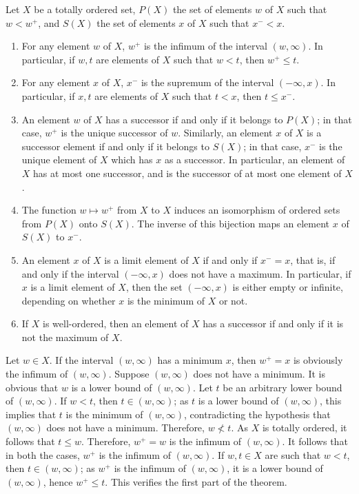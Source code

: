 \documentclass{article}
\begin{document}
\begin{theorem}
  \label{thm:q8h11s4b}
  Let \(X\) be a totally ordered set, \(P(X)\) the set of elements
  \(w\) of \(X\) such that \(w < w^+\), and \(S(X)\) the set of
  elements \(x\) of \(X\) such that \(x^- < x\).
  \begin{enumerate}
  \item For any element \(w\) of \(X\), \(w^+\) is the infimum of the
    interval \((w, \infty)\).  In particular, if \(w, t\) are elements
    of \(X\) such that \(w < t\), then \(w^+ \leq t\).
  \item For any element \(x\) of \(X\), \(x^-\) is the supremum of the
    interval \((-\infty, x)\).  In particular, if \(x, t\) are
    elements of \(X\) such that \(t < x\), then \(t \leq x^-\).
  \item An element \(w\) of \(X\) has a successor if and only if it
    belongs to \(P(X)\); in that case, \(w^+\) is the unique successor
    of \(w\).  Similarly, an element \(x\) of \(X\) is a successor
    element if and only if it belongs to \(S(X)\); in that case,
    \(x^-\) is the unique element of \(X\) which has \(x\) as a
    successor.  In particular, an element of \(X\) has at most one
    successor, and is the successor of at most one element of \(X\).
  \item The function \(w \mapsto w^+\) from \(X\) to \(X\) induces an
    isomorphism of ordered sets from \(P(X)\) onto \(S(X)\).  The
    inverse of this bijection maps an element \(x\) of \(S(X)\) to
    \(x^-\).
  \item An element \(x\) of \(X\) is a limit element of \(X\) if and
    only if \(x^- = x\), that is, if and only if the interval
    \((-\infty, x)\) does not have a maximum.  In particular, if \(x\)
    is a limit element of \(X\), then the set \((-\infty, x)\) is
    either empty or infinite, depending on whether \(x\) is the
    minimum of \(X\) or not.
  \item If \(X\) is well-ordered, then an element of \(X\) has a
    successor if and only if it is not the maximum of \(X\).
  \end{enumerate}
\end{theorem}

Let \(w \in X\).  If the interval \((w, \infty)\) has a minimum \(x\),
then \(w^+ = x\) is obviously the infimum of \((w, \infty)\).  Suppose
\((w, \infty)\) does not have a minimum.  It is obvious that \(w\) is
a lower bound of \((w, \infty)\).  Let \(t\) be an arbitrary lower
bound of \((w, \infty)\).  If \(w < t\), then \(t \in (w, \infty)\);
as \(t\) is a lower bound of \((w, \infty)\), this implies that \(t\)
is the minimum of \((w, \infty)\), contradicting the hypothesis that
\((w, \infty)\) does not have a minimum.  Therefore, \(w \nless t\).
As \(X\) is totally ordered, it follows that \(t \leq w\).  Therefore,
\(w^+ = w\) is the infimum of \((w, \infty)\).  It follows that in
both the cases, \(w^+\) is the infimum of \((w, \infty)\).  If
\(w, t \in X\) are such that \(w < t\), then \(t \in (w, \infty)\); as
\(w^+\) is the infimum of \((w, \infty)\), it is a lower bound of
\((w, \infty)\), hence \(w^+ \leq t\).  This verifies the first part
of the theorem.
\end{document}
